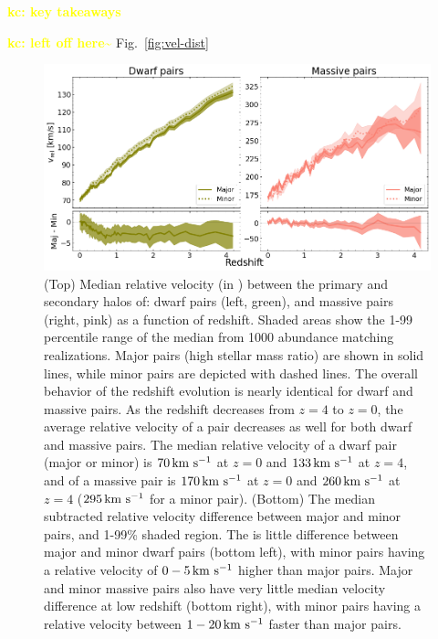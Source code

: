 \documentclass[twocolumn]{aastex631}
\newcommand{\kc}[1]{\textcolor{yellow}{\textbf{kc: #1}} }
\begin{document}
\kc{key takeaways}


\kc{left off here\~}
Fig.~\ref{fig:vel-dist}

\begin{figure}[htp]
  \centering
  \includegraphics[width=\textwidth]{vel_1000.png}
  \caption{
    (Top) Median relative velocity (in \kms) between the primary and secondary halos of: dwarf pairs (left, green), and massive pairs (right, pink) as a function of redshift. 
    Shaded areas show the 1-99 percentile range of the median from 1000 abundance matching realizations. Major pairs (high stellar mass ratio) are shown in solid lines, while minor pairs are depicted with dashed lines.
    The overall behavior of the redshift evolution is nearly identical for dwarf and massive pairs.
    As the redshift decreases from $z=4$ to $z=0$, the average relative velocity of a pair decreases as well for both dwarf and massive pairs.
    The median relative velocity of a dwarf pair (major or minor) is $70\,\mathrm{km}~\mathrm{s}^{-1}$ at $z=0$ and $133\,\mathrm{km}~\mathrm{s}^{-1}$ at $z=4$, and of a massive pair is $170\,\mathrm{km}~\mathrm{s}^{-1}$ at $z=0$ and $260\,\mathrm{km}~\mathrm{s}^{-1}$ at $z=4$ ($295\,\mathrm{km}~\mathrm{s}^{-1}$ for a minor pair). 
    (Bottom) The median subtracted relative velocity difference between major and minor pairs, and 1-99\% shaded region.
    The is little difference between major and minor dwarf pairs (bottom left), with minor pairs having a relative velocity of $0-5\,\mathrm{km}~\mathrm{s}^{-1}$ higher than major pairs. 
    Major and minor massive pairs also have very little median velocity difference at low redshift (bottom right), with minor pairs having a relative velocity between $1-20\,\mathrm{km}~\mathrm{s}^{-1}$ faster than major pairs.
    }
  \label{fig:vel}
\end{figure}
\end{document}
